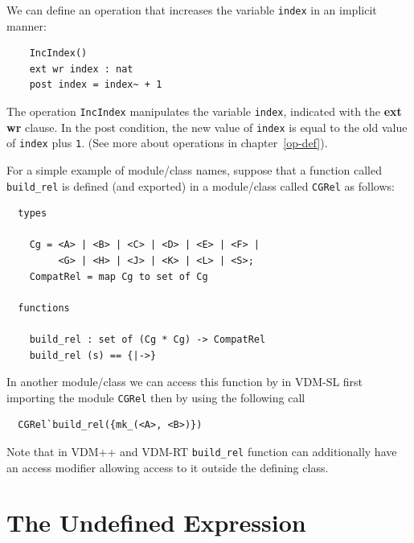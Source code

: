 \documentclass{overturerepchap}
\newcommand{\keyw}[1]{{\bf\ttfamily #1}}
\begin{document}
\begin{description}
  We can define an operation that increases the variable {\tt index} in
  an implicit manner:
  \begin{lstlisting}
    IncIndex()
    ext wr index : nat
    post index = index~ + 1
  \end{lstlisting}
  The operation {\tt IncIndex} manipulates the variable {\tt index},
  indicated with the \keyw{ext wr} clause. In the post condition, the new
  value of {\tt index} is equal to the old value of {\tt index} plus
  \texttt{1}. (See more about operations in chapter~\ref{op-def}).

  For a simple example of 
module/class
  names, suppose that a function called 
  \texttt{build\_rel} is defined (and exported) in a 
module/class
  called 
  \texttt{CGRel} as follows:
\begin{lstlisting}
  types

    Cg = <A> | <B> | <C> | <D> | <E> | <F> | 
         <G> | <H> | <J> | <K> | <L> | <S>;
    CompatRel = map Cg to set of Cg

  functions

    build_rel : set of (Cg * Cg) -> CompatRel
    build_rel (s) == {|->}
\end{lstlisting}
In another 
module/class
  we can access this function by in VDM-SL
first importing the module \texttt{CGRel} then by 
  using the following call 
  \begin{lstlisting}
  CGRel`build_rel({mk_(<A>, <B>)})
  \end{lstlisting}
Note that in VDM++ and VDM-RT \texttt{build\_rel} function can
additionally have
an access modifier allowing access to it outside the defining class.
\end{description}

\section{The Undefined Expression}
\end{document}

